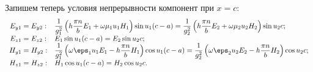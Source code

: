 \documentclass[12pt]{hedsemwork}
\renewcommand{\frac}{\dfrac}
\begin{document}
Запишем теперь условия непрерывности компонент при \( x = c \):
\begin{equation}
\begin{array}{cl}
    E_{y1} = E_{y2}: &
    \frac{1}{g_1^2} \left(h \frac{\pi n}{b} E_1 + \omega\mu_1u_1H_1\right)
    \sin u_1 (c-a) =  \frac{1}{g_2^2}
    \left(h \frac{\pi n}{b} E_2 + \omega\mu_2u_2H_2\right)
    \sin u_2 c ;\\
    E_{z1} = E_{z2}: & E_1\sin u_1 (c-a) = E_2\sin u_2 c; \\
    H_{y1} = H_{y2}: &
    \frac{1}{g_1^2}\left(\omega\eps_1u_1E_1-h \frac{\pi n}{b} H_1\right)
    \cos u_1 (c-a) = \frac{1}{g_2^2}
    \left(\omega\eps_2u_2E_2-h \frac{\pi n}{b} H_2\right)\cos u_2 c ;\\
    H_{z1} = H_{z2}: & H_1\cos u_1 (c-a) = H_2\cos u_2 c.\\
\end{array}
    \label{eq:fast_waves_continuity}
\end{equation}
\end{document}
